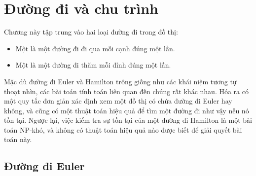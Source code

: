 \chapter{Đường đi và chu trình}


Chương này tập trung vào hai loại đường đi trong đồ thị:
\begin{itemize}
\item Một  là một đường đi
đi qua mỗi cạnh đúng một lần.
\item Một  là một đường đi
thăm mỗi đỉnh đúng một lần.
\end{itemize}

Mặc dù đường đi Euler và Hamilton trông giống như
các khái niệm tương tự thoạt nhìn,
các bài toán tính toán liên quan đến chúng
rất khác nhau.
Hóa ra có một quy tắc đơn giản
xác định xem một đồ thị có chứa đường đi Euler hay không,
và cũng có một thuật toán hiệu quả để
tìm một đường đi như vậy nếu nó tồn tại.
Ngược lại, việc kiểm tra sự tồn tại của một đường đi Hamilton là một bài toán NP-khó, và không có thuật toán hiệu quả nào được biết để giải quyết bài toán này.

\section{Đường đi Euler}


